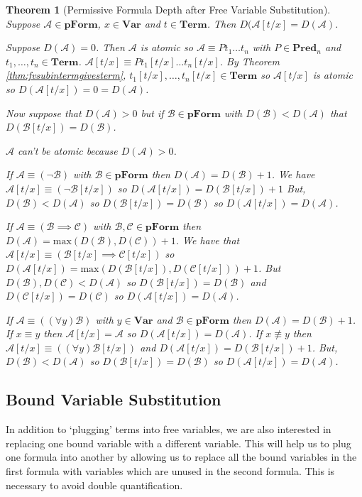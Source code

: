 \documentclass[12pt]{article}
\theoremstyle{break}
\theoremstyle{break}
\newtheorem{theorem}{Theorem}[section]
\theoremstyle{break}
\theoremstyle{break}
\theoremstyle{break}
\newtheorem{informal definition}[definition]{Informal Definition}
\newcommand{\mc}[1]{\mathcal{#1}}
\begin{document}
\begin{theorem}[Permissive Formula Depth after Free Variable Substitution]
\label{thm:pformdepthaftertermsub}
Suppose $\mc{A} \in \textbf{pForm}$, $x\in\textbf{Var}$ and $t\in\textbf{Term}$. Then $D(\mc{A}[t/x] = D(\mc{A})$.

Suppose $D(\mc{A}) = 0$.
Then $\mc{A}$ is atomic so $\mc{A}\equiv Pt_1\ldots t_n$ with $P\in\textbf{Pred}_n$ and $t_1,\ldots,t_n \in \textbf{Term}$.
$\mc{A}[t/x] \equiv P t_1[t/x]\ldots t_n[t/x]$.
By Theorem \ref{thm:fvsubintermgivesterm}, $t_1[t/x],\ldots, t_n[t/x]\in\textbf{Term}$ so $\mc{A}[t/x]$ is atomic so $D(\mc{A}[t/x])=0=D(\mc{A})$.

Now suppose that $D(\mc{A})>0$ but if $\mc{B}\in\textbf{pForm}$ with $D(\mc{B}) < D(\mc{A})$ that $D(\mc{B}[t/x]) = D(\mc{B})$.

$\mc{A}$ can't be atomic because $D(\mc{A}) >0$.

If $\mc{A}\equiv (\lnot \mc{B})$ with $\mc{B}\in\textbf{pForm}$ then $D(\mc{A}) = D(\mc{B}) + 1$.
We have $\mc{A}[t/x] \equiv (\lnot \mc{B}[t/x])$ so $D(\mc{A}[t/x]) = D(\mc{B}[t/x]) + 1$
But, $D(\mc{B}) < D(\mc{A})$ so $D(\mc{B}[t/x]) = D(\mc{B})$ so $D(\mc{A}[t/x]) = D(\mc{A})$.

If $\mc{A} \equiv (\mc{B}\implies \mc{C})$ with $\mc{B}, \mc{C}\in\textbf{pForm}$ then $D(\mc{A}) = \text{max}(D(\mc{B}), D(\mc{C})) + 1$.
We have that $\mc{A}[t/x] \equiv (\mc{B}[t/x] \implies \mc{C}[t/x])$ so $D(\mc{A}[t/x]) = \text{max}(D(\mc{B}[t/x]), D(\mc{C}[t/x])) + 1$.
But $D(\mc{B}), D(\mc{C}) < D(\mc{A})$ so $D(\mc{B}[t/x]) = D(\mc{B})$ and $D(\mc{C}[t/x]) = D(\mc{C})$ so $D(\mc{A}[t/x]) = D(\mc{A})$.

If $\mc{A} \equiv ((\forall y)\mc{B})$ with $y\in\textbf{Var}$ and $\mc{B}\in\textbf{pForm}$ then $D(\mc{A}) = D(\mc{B}) + 1$.
If $x\equiv y$ then $\mc{A}[t/x] = \mc{A}$ so $D(\mc{A}[t/x]) = D(\mc{A})$.
If $x\not \equiv y$ then $\mc{A}[t/x] \equiv ((\forall y)\mc{B}[t/x])$ and $D(\mc{A}[t/x]) = D(\mc{B}[t/x]) + 1$.
But, $D(\mc{B}) < D(\mc{A})$ so $D(\mc{B}[t/x]) = D(\mc{B})$ so $D(\mc{A}[t/x]) = D(\mc{A})$.
\end{theorem}

\subsection{Bound Variable Substitution}

In addition to `plugging' terms into free variables, we are also interested in replacing one bound variable with a different variable.
This will help us to plug one formula into another by allowing us to replace all the bound variables in the first formula with variables which are unused in the second formula.
This is  necessary to avoid double quantification.
\end{document}
